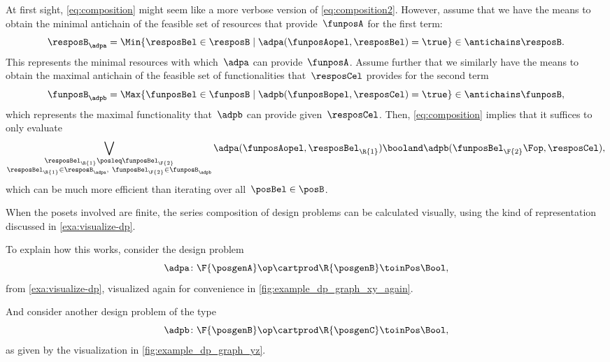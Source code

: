 \begin{remark}
	At first sight, \cref{eq:composition} might seem like a more verbose version of \cref{eq:composition2}.
	However, assume that we have the means to obtain the minimal antichain of the feasible set of resources that provide~$\funposA$ for the first term:
	\begin{equation*}
		\resposB_\adpa = \Min \{\resposBel\in \resposB \mid \adpa(\funposAopel,\resposBel)=\true\} \in \antichains \resposB.
	\end{equation*}
	This represents the minimal resources with which~$\adpa$ can provide~$\funposA$.
	Assume further that we similarly have the means to obtain the maximal antichain of the feasible set of functionalities that~$\resposCel$ provides for the second term
	\begin{equation*}
		\funposB_\adpb = \Max \{\funposBel\in \funposB \mid \adpb(\funposBopel,\resposCel)=\true\} \in \antichains \funposB,
	\end{equation*}
	which represents the maximal functionality that~$\adpb$ can provide given~$\resposCel$.
	Then, \cref{eq:composition} implies that it suffices to only evaluate
	\begin{equation*}
		\bigvee_{\substack{\resposBel_\R{1}\posleq\funposBel_\F{2} \\ \resposBel_\R{1}\in \resposB_\adpa,~ \funposBel_\F{2}\in\funposB_\adpb }} \adpa(\funposAopel,\resposBel_\R{1}) \booland \adpb(\funposBel_\F{2}\Fop,\resposCel),
	\end{equation*}
	which can be much more efficient than iterating over all~$\posBel\in \posB$.
\end{remark}

When the posets involved are finite, the series composition of design problems can be calculated visually, using the kind of representation discussed in \cref{exa:visualize-dp}.
\begin{marginfigure}
	\centering
	\caption{ }
	\label{fig:example_dp_graph_xy_again}
\end{marginfigure}
To explain how this works, consider the design problem
\begin{equation*}
	\adpa \colon \F{\posgenA} \op \cartprod  \R{\posgenB} \toinPos \Bool,
\end{equation*}
from \cref{exa:visualize-dp}, visualized again for convenience in \cref{fig:example_dp_graph_xy_again}.
\begin{marginfigure}
	\centering
	\caption{ }
	\label{fig:example_dp_graph_yz}
\end{marginfigure}
And consider another design problem of the type
\begin{equation*}
	\adpb \colon \F{\posgenB} \op \cartprod  \R{\posgenC} \toinPos \Bool,
\end{equation*}
as given by the visualization in \cref{fig:example_dp_graph_yz}.

